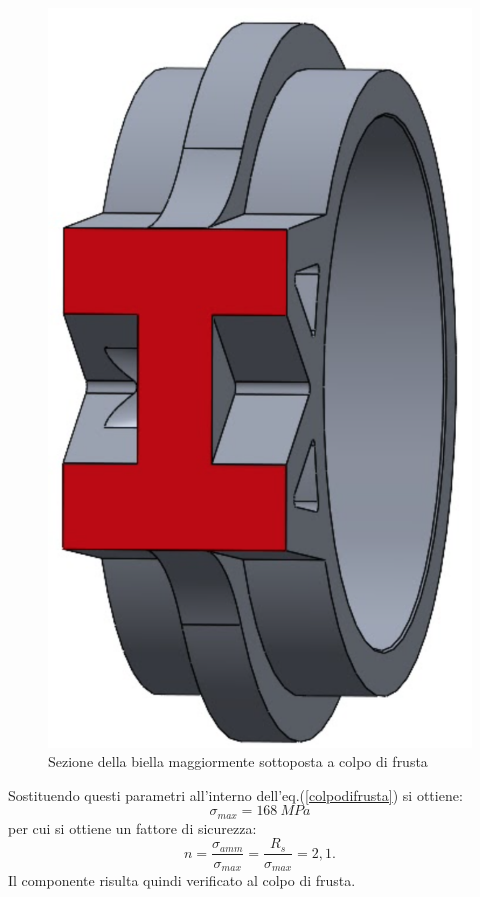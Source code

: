 \begin{figure}[h]
    \centering
    \includegraphics[scale=0.3]{Immagini/SezioneColpoFrustaBiella.png}
    \caption{Sezione della biella maggiormente sottoposta a colpo di frusta}
    \label{fig:SezioneColpoFrustaBiella}
\end{figure}
Sostituendo questi parametri all'interno dell'eq.(\ref{colpodifrusta}) si ottiene:
\begin{equation}
    \sigma_{max}=168\ MPa
\end{equation}
per cui si ottiene un fattore di sicurezza:
\begin{equation}
    n=\frac{\sigma_{amm}}{\sigma_{max}}=\frac{R_s}{\sigma_{max}}=2,1. 
\end{equation}
Il componente risulta quindi verificato al colpo di frusta.
